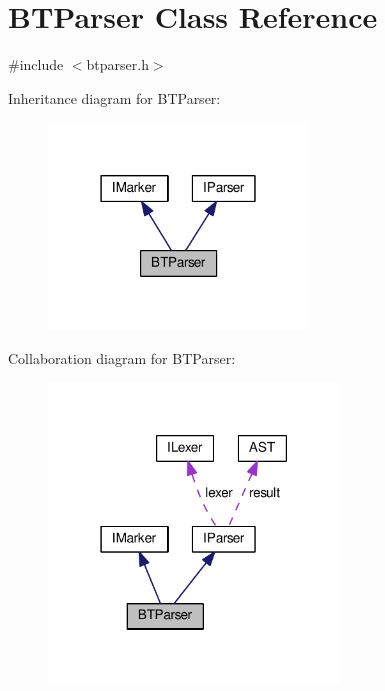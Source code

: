 \hypertarget{class_b_t_parser}{\section{B\-T\-Parser Class Reference}
\label{class_b_t_parser}
}


{\ttfamily \#include $<$btparser.\-h$>$}



Inheritance diagram for B\-T\-Parser\-:
\nopagebreak
\begin{figure}[H]
\begin{center}
\leavevmode
\includegraphics[width=195pt]{class_b_t_parser__inherit__graph}
\end{center}
\end{figure}


Collaboration diagram for B\-T\-Parser\-:
\nopagebreak
\begin{figure}[H]
\begin{center}
\leavevmode
\includegraphics[width=219pt]{class_b_t_parser__coll__graph}
\end{center}
\end{figure}
